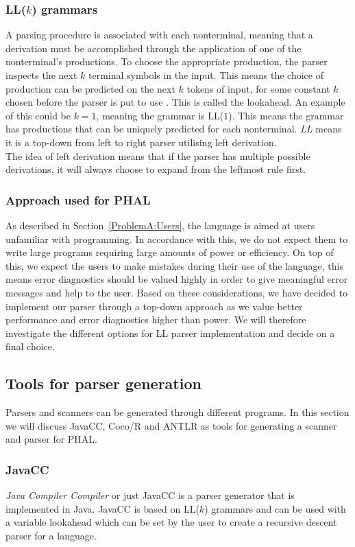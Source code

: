 \subsubsection{LL($k$) grammars}
A parsing procedure is associated with each nonterminal, meaning that a derivation must be accomplished through the application of one of the nonterminal's productions. To choose the appropriate production, the parser inspects the next $k$ terminal symbols in the input. This means the choice of production can be predicted on the next $k$ tokens of input, for some constant $k$ chosen before the parser is put to use \cite{CraftinfACompiler}. This is called the lookahead. An example of this could be $k = 1$, meaning the grammar is LL($1$). This means the grammar has productions that can be uniquely predicted for each nonterminal. \textit{LL} means it is a top-down from left to right parser utilising left derivation.\\
The idea of left derivation means that if the parser has multiple possible derivations, it will always choose to expand from the leftmost rule first.\\

\subsubsection{Approach used for PHAL}
As described in Section~\ref{ProblemA:Users}, the language is aimed at users unfamiliar with programming. In accordance with this, we do not expect them to write large programs requiring large amounts of power or efficiency. On top of this, we expect the users to make mistakes during their use of the language, this means error diagnostics should be valued highly in order to give meaningful error messages and help to the user. Based on these considerations, we have decided to implement our parser through a top-down approach as we value better performance and error diagnostics higher than power. We will therefore investigate the different options for LL parser implementation and decide on a final choice.

\subsection{Tools for parser generation}
Parsers and scanners can be generated through different programs. In this section we will discuss JavaCC, Coco/R and ANTLR as tools for generating a scanner and parser for PHAL.

\subsubsection{JavaCC}
\textit{Java Compiler Compiler} or just JavaCC is a parser generator that is implemented in Java. JavaCC is based on LL($k$) grammars and can be used with a variable lookahead which can be set by the user to create a recursive descent parser for a language. 

